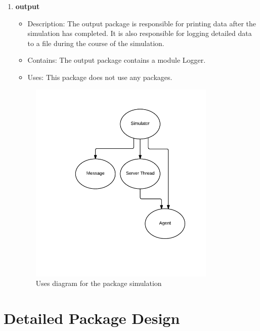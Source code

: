 \begin{enumerate}
\item\textbf{output}
\begin{itemize}
\item Description: The output package is responsible for printing data after the simulation has completed. It is also responsible for logging detailed data to a file during the course of the simulation.
\item Contains: The output package contains a module Logger.
\item Uses: This package does not use any packages.
\end{itemize}

\begin{figure}[H]
\centering
\includegraphics[trim=0.5cm 2.5cm 0.5cm 1.0cm, width=3.5in]{figs/simPackage}
\caption{Uses diagram for the package simulation}
\label{fig:simulation}
\end{figure}

\end{enumerate}

\section{Detailed Package Design}

